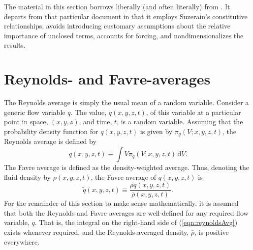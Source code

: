 \documentclass[letterpaper,11pt,nointlimits,reqno,draft]{amsbook}
\begin{document}
The material in this section borrows liberally (and often literally) from
\citet{OliverFANSModels2011}.  It departs from that particular document in that
it employs Suzerain's constitutive relationships, avoids introducing customary
assumptions about the relative importance of unclosed terms, accounts for
forcing, and nondimensionalizes the results.

\section{Reynolds- and Favre-averages}
\label{sec:averaging}

The Reynolds average is simply the usual mean of a random variable.  Consider a
generic flow variable $q$.  The value, $q(x, y, z, t)$, of this variable at a
particular point in space, $(x, y, z)$, and time, $t$, is a random variable.
Assuming that the probability density function for $q(x, y, z, t)$ is given by
$\pi_q(V; x, y, z, t)$, the Reynolds average is defined by
%
\begin{equation}
\label{eqn:reynoldsAvg}
\bar{q}(x, y, z, t) \equiv \int V \pi_q(V; x, y, z, t) \,\mathrm{d} V.
\end{equation}
%
The Favre average is defined as the density-weighted average.  Thus,
denoting the fluid density by $\rho(x,y,z, t)$, the Favre average of
$q(x,y,z, t)$ is
%
\begin{equation*}
\tilde{q}(x,y,z, t) \equiv \frac{ \overline{\rho q}(x,y,z, t) }{ \bar{\rho}(x,y,z, t) }.
\end{equation*}
%
For the remainder of this section to make sense mathematically, it is
assumed that both the Reynolds and Favre averages are well-defined for
any required flow variable, $q$.  That is, the integral on the
right-hand side of (\ref{eqn:reynoldsAvg}) exists whenever required,
and the Reynolds-averaged density, $\bar{\rho}$, is positive
everywhere.
\end{document}
